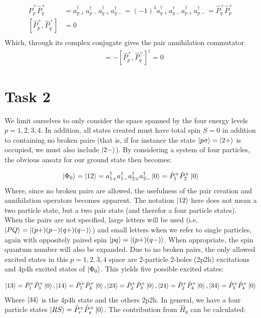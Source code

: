\documentclass{article}
\newcommand{\crt}[1]{a_{#1}^{\dagger}}
\newcommand{\vac}{\ket{0}}
\newcommand{\gs}{\ket{\Phi_0}}
\newcommand{\pplus}[1]{\hat{P}_{#1}^{+}}
\newcommand{\pminus}[1]{\hat{P}_{#1}^{-}}
\begin{document}
\begin{align*}
    \pplus{p}\pplus{q} &= \crt{p+}\crt{p-}\crt{q+}\crt{q-} = (-1)^4 \crt{q+}\crt{q-}\crt{p+}\crt{p-} = \pplus{q}\pplus{p} \\
    [\pplus{p}, \pplus{q}] &= 0 \\
\end{align*}
Which, through its complex conjugate gives the pair annihilation commutator.
\begin{align*}
    [\pminus{p}, \pminus{q}] &= - [\pplus{p}, \pplus{q}]^\dagger = 0
\end{align*}


\section*{Task 2}
    We limit ourselves to only consider the space spanned by the four energy levels $p = 1,2,3,4$. In addition, all states created must have total spin $S = 0$ in addition to containing no broken pairs (that is, if for instance the state $\ket{p\sigma} = \ket{2+}$ is occupied, we must also include $\ket{2-}$). By considering a system of four particles, the obvious ansatz for our ground state then becomes:
    
    \begin{align*}
        \gs = \ket{12} = \crt{1+}\crt{1-}\crt{2+}\crt{2-}\vac = \pplus{1}\pplus{2} \vac
    \end{align*}
    Where, since no broken pairs are allowed, the usefulness of the pair creation and annihilation operators becomes apparent. The notation $\ket{12}$ here does not mean a two particle state, but a two pair state (and therefor a four particle states). When the pairs are not specified, large letters will be used (i.e. $\ket{PQ} = \ket{(p+)(p-)(q+)(q-)}$) and small letters when we refer to single particles, again with oppositely paired spin $\ket{pq} = \ket{(p+)(q-)}$. When appropriate, the spin quantum number will also be expanded. Due to no broken pairs, the only allowed excited states in this $p = 1,2,3,4$ space are 2-particle 2-holes (2p2h) excitations and 4p4h excited states of $\gs$. This yields five possible excited states:

    \begin{align*}
        \ket{13} = \pplus{1}\pplus{3}\vac, \ket{14} = \pplus{1}\pplus{4}\vac, \ket{23} = \pplus{2}\pplus{3}\vac, \ket{24} = \pplus{2}\pplus{4}\vac, \ket{34} = \pplus{3}\pplus{4}\vac
    \end{align*}
    Where $\ket{34}$ is the 4p4h state and the others 2p2h. In general, we have a four particle states $\ket{RS} = \pplus{r}\pplus{s}\vac$. The contribution from $\hat{H}_0$ can be calculated:
    
\end{document}
